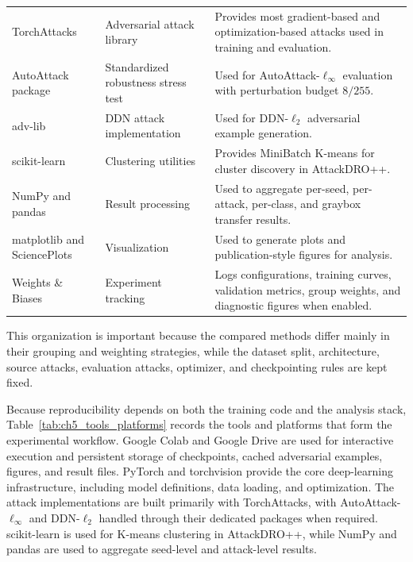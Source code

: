 \begin{table}[H]
\begin{tabularx}{\textwidth}{@{}
>{\raggedright\arraybackslash}p{}
>{\raggedright\arraybackslash}p{}
>{\raggedright\arraybackslash}X
@{}}
TorchAttacks
& Adversarial attack library
& Provides most gradient-based and optimization-based attacks used in training and evaluation. \\

AutoAttack package
& Standardized robustness stress test
& Used for AutoAttack-$\ell_\infty$ evaluation with perturbation budget $8/255$. \\

adv-lib
& DDN attack implementation
& Used for DDN-$\ell_2$ adversarial example generation. \\

scikit-learn
& Clustering utilities
& Provides MiniBatch K-means for cluster discovery in AttackDRO++. \\

NumPy and pandas
& Result processing
& Used to aggregate per-seed, per-attack, per-class, and graybox transfer results. \\

matplotlib and SciencePlots
& Visualization
& Used to generate plots and publication-style figures for analysis. \\

Weights \& Biases
& Experiment tracking
& Logs configurations, training curves, validation metrics, group weights, and diagnostic figures when enabled. \\

\bottomrule
\end{tabularx}
\end{table}

\newpage
This organization is important because the compared methods differ
mainly in their grouping and weighting strategies, while the dataset split,
architecture, source attacks, evaluation attacks, optimizer, and checkpointing
rules are kept fixed.


Because reproducibility depends on both the training code and the analysis stack,
Table~\ref{tab:ch5_tools_platforms} records the tools and platforms that form the
experimental workflow. Google Colab and Google Drive are used for
interactive execution and persistent storage of checkpoints, cached adversarial
examples, figures, and result files. PyTorch and torchvision provide the core
deep-learning infrastructure, including model definitions, data loading, and
optimization. The attack implementations are built primarily with TorchAttacks,
with AutoAttack-$\ell_\infty$ and DDN-$\ell_2$ handled through their dedicated
packages when required. scikit-learn is used for K-means clustering in
AttackDRO++, while NumPy and pandas are used to aggregate seed-level and
attack-level results.

